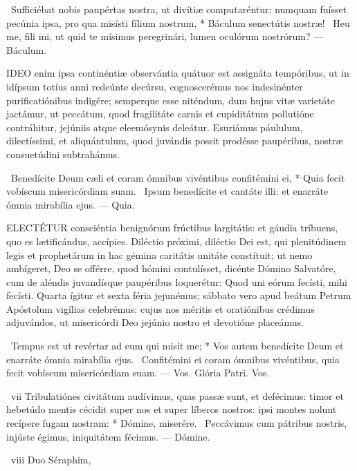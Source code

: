 \R\ Sufficiébat nobis paupértas nostra, ut divítiæ computaréntur: numquam fuísset pecúnia ipsa, pro qua misísti fílium nostrum, * Báculum senectútis nostræ! \V\ Heu me, fili mi, ut quid te mísimus peregrinári, lumen oculórum nostrórum? — Báculum.


\lettrine[lines=2]{I}{DEO} enim ipsa continéntiæ observántia quátuor est assignáta tempóribus, ut in idípsum totíus anni redeúnte decúrsu, cognoscerémus nos indesinénter purificatiónibus indigére; semperque esse niténdum, dum hujus vitæ varietáte jactámur, ut peccátum, quod fragilitáte carnis et cupiditátum pollutióne contráhitur, jejúniis atque eleemósynis deleátur. Esuriámus páululum, dilectíssimi, et aliquántulum, quod juvándis possit prodésse paupéribus, nostræ consuetúdini subtrahámus.

\R\ Benedícite Deum cæli et coram ómnibus vivéntibus confitémini ei, * Quia fecit vobíscum misericórdiam suam. \V\ Ipsum benedícite et cantáte illi: et enarráte ómnia mirabília ejus. — Quia.


\lettrine[lines=2]{E}{LECTÉTUR} consciéntia benignórum frúctibus largitátis: et gáudia tríbuens, quo es lætificándus, accípies. Diléctio próximi, diléctio Dei est, qui plenitúdinem legis et prophetárum in hac gémina caritátis unitáte constítuit; ut nemo ambígeret, Deo se offérre, quod hómini contulísset, dicénte Dómino Salvatóre, cum de aléndis juvandísque paupéribus loquerétur: Quod uni eórum fecísti, mihi fecísti. Quarta ígitur et sexta féria jejunémus; sábbato vero apud beátum Petrum Apóstolum vigílias celebrémus: cujus nos méritis et oratiónibus crédimus adjuvándos, ut misericórdi Deo jejúnio nostro et devotióne placeámus.

\R\ Tempus est ut revértar ad eum qui misit me; * Vos autem benedícite Deum et enarráte ómnia mirabília ejus. \V\ Confitémini ei coram ómnibus vivéntibus, quia fecit vobíscum misericórdiam suam. — Vos. Glória Patri. Vos.

\R\ vii Tribulatiónes civitátum audívimus, quas passæ sunt, et defécimus: timor et hebetúdo mentis cécidit super nos et super líberos nostros: ipsi montes nolunt recípere fugam nostram: * Dómine, miserére. \V\ Peccávimus cum pátribus nostris, injúste égimus, iniquitátem fécimus. — Dómine.

\R\ viii Duo Séraphim, 


